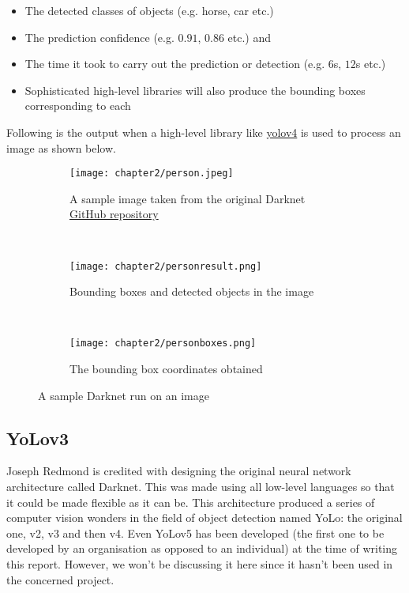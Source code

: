 \begin{itemize}
  \item The detected classes of objects (e.g. horse, car etc.)
  \item	The prediction confidence (e.g. $0.91$, $0.86$ etc.) and
  \item	The time it took to carry out the prediction or detection (e.g. $6$s, $12$s etc.)
  \item	Sophisticated high-level libraries will also produce the bounding boxes corresponding to each
\end{itemize}

\vspace{-0.1in}

Following is the output when a high-level library like \href{https://pypi.org/project/yolov4/}{yolov4} is used to process an image as shown below.

\begin{figure}[h]

\begin{center}
\begin{subfigure}{0.7\textwidth}
  \texttt{[image: chapter2/person.jpeg]}
  \caption{A sample image taken from the original Darknet \href{https://github.com/AlexeyAB/darknet}{GitHub repository}}
  \label{fig:person_sub1}
 \end{subfigure} \\
 \begin{subfigure}{0.7\textwidth}
  \texttt{[image: chapter2/personresult.png]}
  \caption{Bounding boxes and detected objects in the image}
  \label{fig:person_sub2}
  \end{subfigure} \\
  \begin{subfigure}{0.7\textwidth}
   \texttt{[image: chapter2/personboxes.png]}
   \caption{The bounding box coordinates obtained}
   \label{fig:person_sub3}
 \end{subfigure}

 \caption{A sample Darknet run on an image}
 \label{fig:person_ref}

\end{center}

\end{figure}



\subsection{YoLov3 \cite{yolov3}}
Joseph Redmond is credited with designing the original neural network architecture called Darknet. This was made using all low-level languages so that it could be made flexible as it can be. This architecture produced a series of computer vision wonders in the field of object detection named YoLo: the original one, v2, v3 and then v4. Even YoLov5 has been developed (the first one to be developed by an organisation as opposed to an individual) at the time of writing this report. However, we won’t be discussing it here since it hasn’t been used in the concerned project. \par

